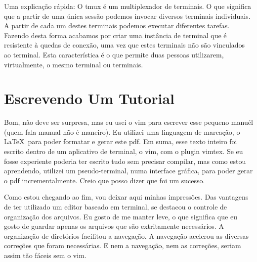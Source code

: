 Uma explicação rápida:
O tmux é um multiplexador de terminais. O que significa que a partir de uma única sessão
podemos invocar diversos terminais individuais.
A partir de cada um destes terminais podemos executar diferentes tarefas.
Fazendo desta forma acabamos por criar uma instância de terminal que é resistente à quedas de conexão,
uma vez que estes terminais não são vinculados ao terminal.
Esta característica é o que permite duas pessoas utilizarem, virtualmente, o mesmo terminal ou terminais.

\section{Escrevendo Um Tutorial}
Bom, não deve ser surpresa, mas eu usei o vim para escrever esse pequeno manuél (quem fala manual não é maneiro).
Eu utilizei uma linguagem de marcação, o \LaTeX\ para poder formatar e gerar este pdf.
Em suma, esse texto inteiro foi escrito dentro de um aplicativo de terminal, o vim, com o plugin vimtex.
Se eu fosse experiente poderia ter escrito tudo sem precisar compilar, mas como estou aprendendo,
utilizei um pseudo-terminal, numa interface gráfica, para poder gerar o pdf incrementalmente.
Creio que posso dizer que foi um sucesso.

Como estou chegando ao fim, vou deixar aqui minhas impressões.
Das vantagens de ter utilizado um editor baseado em terminal, se destacou o controle de organização dos arquivos.
Eu gosto de me manter leve, o que significa que eu gosto de guardar apenas os arquivos que são extritamente necessários.
A organização de diretórios facilitou a navegação.
A navegação acelerou as diversas correções que foram necessárias.
E nem a navegação, nem as correções, seriam assim tão fáceis sem o vim.


